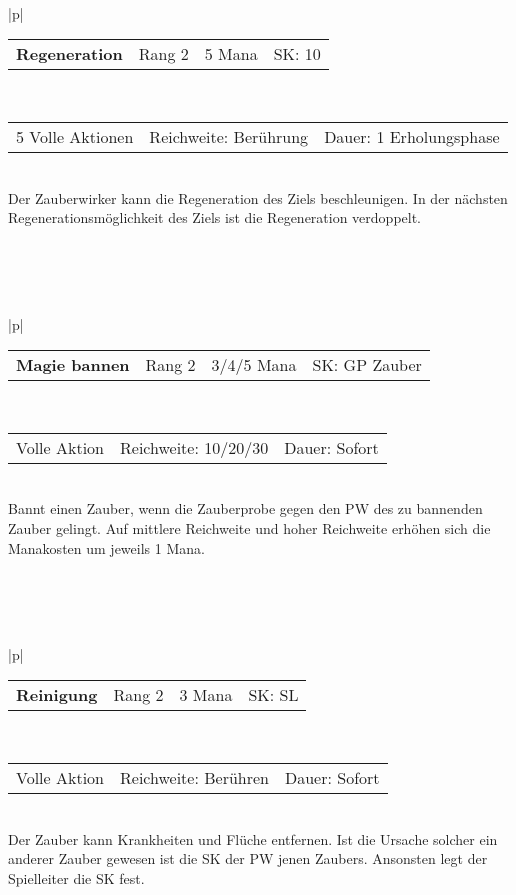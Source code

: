 \documentclass[../../Heldenanleitung2]{subfiles}
\begin{document}
\\\\\\
\begin{tabular}{|p{\textwidth}|}
\hline
\begin{tabularx}{\textwidth}{X|X|X|X}
\textbf{Regeneration} & Rang 2 & 5 Mana & SK: 10
\end{tabularx} \\ \hline
\begin{tabularx}{\textwidth}{X|X|X}
5 Volle Aktionen & Reichweite: Berührung & Dauer: 1 Erholungsphase
\end{tabularx} \\ \hline
Der Zauberwirker kann die Regeneration des Ziels beschleunigen. In der nächsten Regenerationsmöglichkeit des Ziels ist die Regeneration verdoppelt.
\\ \hline
\end{tabular}
\\\\\\
\begin{tabular}{|p{\textwidth}|}
\hline
\begin{tabularx}{\textwidth}{X|X|X|X}
\textbf{Magie bannen} & Rang 2 & 3/4/5 Mana & SK: GP Zauber
\end{tabularx} \\ \hline
\begin{tabularx}{\textwidth}{X|X|X}
Volle Aktion & Reichweite: 10/20/30 & Dauer: Sofort
\end{tabularx} \\ \hline
Bannt einen Zauber, wenn die Zauberprobe gegen den PW des zu bannenden Zauber gelingt. Auf mittlere Reichweite und hoher Reichweite erhöhen sich die Manakosten um jeweils 1 Mana.
\\ \hline
\end{tabular}
\\\\\\
\begin{tabular}{|p{\textwidth}|}
\hline
\begin{tabularx}{\textwidth}{X|X|X|X}
\textbf{Reinigung} & Rang 2 & 3 Mana & SK: SL
\end{tabularx} \\ \hline
\begin{tabularx}{\textwidth}{X|X|X}
Volle Aktion & Reichweite: Berühren & Dauer: Sofort
\end{tabularx} \\ \hline
Der Zauber kann Krankheiten und Flüche entfernen. Ist die Ursache solcher ein anderer Zauber gewesen ist die SK der PW jenen Zaubers. Ansonsten legt der Spielleiter die SK fest.
\\ \hline
\end{tabular}
\end{document}
